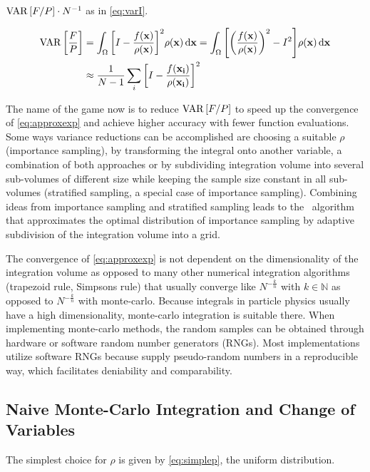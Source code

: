 \(\operatorname{VAR}\qty[F/P]\cdot N^{-1}\) as in \cref{eq:varI}.

\begin{align}
  \operatorname{VAR}\qty[\frac{F}{P}] &= \int_\Omega \qty[I -
  \frac{f(\vb{x})}{\rho(\vb{x})}]^2 \rho({\vb{x}}) \dd{\vb{x}} =
  \int_\Omega \qty[\qty(\frac{f(\vb{x})}{\rho(\vb{x})})^2 -
  I^2]\rho({\vb{x}}) \dd{\vb{x}}   \label{eq:varI}
 \\
  &\approx \frac{1}{N - 1}\sum_i \qty[I -
  \frac{f(\vb{x_i})}{\rho(\vb{x_i})}]^2  \label{eq:varI-approx}
\end{align}

The name of the game now is to reduce \(\operatorname{VAR}\qty[F/P]\) to speed up the
convergence of \cref{eq:approxexp} and achieve higher accuracy with
fewer function evaluations. Some ways variance reductions can be
accomplished are choosing a suitable \(\rho\) (importance sampling),
by transforming the integral onto another variable, a combination of
both approaches or by subdividing integration volume into several
sub-volumes of different size while keeping the sample size constant
in all sub-volumes (stratified sampling, a special case of importance
sampling). Combining ideas from importance sampling and stratified
sampling leads to the \vegas\ algorithm~\cite{Lepage:19781an} that
approximates the optimal distribution of importance sampling by
adaptive subdivision of the integration volume into a grid.

The convergence of \cref{eq:approxexp} is not dependent on the
dimensionality of the integration volume as opposed to many other
numerical integration algorithms (trapezoid rule, Simpsons rule) that
usually converge like \(N^{-\frac{k}{n}}\) with \(k\in\mathbb{N}\) as
opposed to \(N^{-\frac{k}{n}}\) with monte-carlo. Because integrals in
particle physics usually have a high dimensionality, monte-carlo
integration is suitable there. When implementing monte-carlo methods,
the random samples can be obtained through hardware or software random
number generators (RNGs). Most implementations utilize software RNGs
because supply pseudo-random numbers in a reproducible way, which
facilitates deniability and comparability.

\subsection{Naive Monte-Carlo Integration and Change of Variables}
\label{sec:naivechange}

The simplest choice for \(\rho\) is given
by \cref{eq:simplep}, the uniform distribution.

